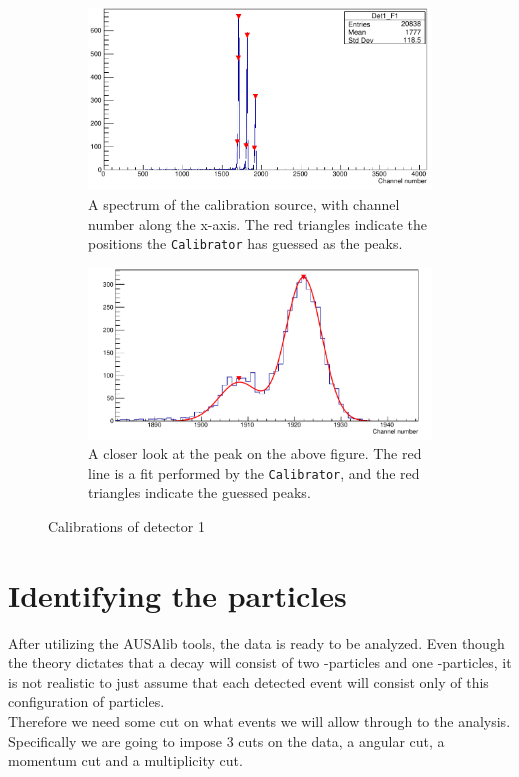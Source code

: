 \begin{figure}[H]
	\begin{subfigure}{\linewidth}
		\centering
		\includegraphics[width=.9\linewidth]{../figures/cali/det1f1-cropped.pdf}
		\caption{A spectrum of the calibration source, with channel number along the x-axis. The red triangles indicate the positions the \texttt{Calibrator} has guessed as the peaks.}
		\label{fig:singleStripExample}
	\end{subfigure}
	\begin{subfigure}{\textwidth}
		\centering
		\includegraphics[width=.9\linewidth]{../figures/cali/det1f1PeakMostLeft-cropped}
		\caption{A closer look at the  peak on the above figure. The red line is a fit performed by the \texttt{Calibrator}, and the red triangles indicate the guessed peaks. }
		\label{fig:peakExample}
	\end{subfigure}
	\caption{Calibrations of detector 1}
	\label{fig:CaliExamples}
\end{figure}


\section{Identifying the particles}
After utilizing the AUSAlib tools, the data is ready to be analyzed. Even though the theory dictates that a decay will consist of two \al-particles and one \be-particles, it is not realistic to just assume that each detected event will consist only of this configuration of particles. \\
Therefore we need some cut on what events we will allow through to the analysis. Specifically we are going to impose 3 cuts on the data, a angular cut, a momentum cut and a multiplicity cut.

